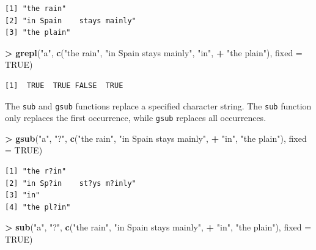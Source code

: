 \documentclass[]{krantz}
\makeatletter
\newenvironment{Shaded}{\begin{snugshade}}{\end{snugshade}}
\newcommand{\DataTypeTok}[1]{\textcolor[rgb]{0.27,0.27,0.27}{#1}}
\newcommand{\KeywordTok}[1]{\textcolor[rgb]{0.27,0.27,0.27}{\textbf{#1}}}
\newcommand{\NormalTok}[1]{#1}
\newcommand{\OperatorTok}[1]{\textcolor[rgb]{0.43,0.43,0.43}{\textbf{#1}}}
\newcommand{\OtherTok}[1]{\textcolor[rgb]{0.37,0.37,0.37}{#1}}
\newcommand{\StringTok}[1]{\textcolor[rgb]{0.5,0.5,0.5}{#1}}
\newenvironment{kframe}{%
\medskip{}
\setlength{\fboxsep}{.8em}
 \def\at@end@of@kframe{}%
 \ifinner\ifhmode%
  \def\at@end@of@kframe{\end{minipage}}%
  \begin{minipage}{\columnwidth}%
 \fi\fi%
 \def\FrameCommand##1{\hskip\@totalleftmargin \hskip-\fboxsep
 \colorbox{shadecolor}{##1}\hskip-\fboxsep
     \hskip-\linewidth \hskip-\@totalleftmargin \hskip\columnwidth}%
 \MakeFramed {\advance\hsize-\width
   \@totalleftmargin\z@ \linewidth\hsize
   \@setminipage}}%
 {\par\unskip\endMakeFramed%
 \at@end@of@kframe}
\renewenvironment{Shaded}{\begin{kframe}}{\end{kframe}}
\makeatother
\begin{document}
\begin{verbatim}
[1] "the rain"                
[2] "in Spain    stays mainly"
[3] "the plain"               
\end{verbatim}

\begin{Shaded}
\begin{Highlighting}[]
\OperatorTok{>}\StringTok{ }\KeywordTok{grepl}\NormalTok{(}\StringTok{"a"}\NormalTok{, }\KeywordTok{c}\NormalTok{(}\StringTok{"the rain"}\NormalTok{, }\StringTok{"in Spain    stays mainly"}\NormalTok{, }\StringTok{"in"}\NormalTok{, }
\OperatorTok{+}\StringTok{   "the plain"}\NormalTok{), }\DataTypeTok{fixed =} \OtherTok{TRUE}\NormalTok{)}
\end{Highlighting}
\end{Shaded}

\begin{verbatim}
[1]  TRUE  TRUE FALSE  TRUE
\end{verbatim}

The \texttt{sub} and \texttt{gsub} functions replace a specified character string. The \texttt{sub} function only replaces the first occurrence, while \texttt{gsub} replaces all occurrences.

\begin{Shaded}
\begin{Highlighting}[]
\OperatorTok{>}\StringTok{ }\KeywordTok{gsub}\NormalTok{(}\StringTok{"a"}\NormalTok{, }\StringTok{"?"}\NormalTok{, }\KeywordTok{c}\NormalTok{(}\StringTok{"the rain"}\NormalTok{, }\StringTok{"in Spain    stays mainly"}\NormalTok{, }
\OperatorTok{+}\StringTok{   "in"}\NormalTok{, }\StringTok{"the plain"}\NormalTok{), }\DataTypeTok{fixed =} \OtherTok{TRUE}\NormalTok{)}
\end{Highlighting}
\end{Shaded}

\begin{verbatim}
[1] "the r?in"                
[2] "in Sp?in    st?ys m?inly"
[3] "in"                      
[4] "the pl?in"               
\end{verbatim}

\begin{Shaded}
\begin{Highlighting}[]
\OperatorTok{>}\StringTok{ }\KeywordTok{sub}\NormalTok{(}\StringTok{"a"}\NormalTok{, }\StringTok{"?"}\NormalTok{, }\KeywordTok{c}\NormalTok{(}\StringTok{"the rain"}\NormalTok{, }\StringTok{"in Spain    stays mainly"}\NormalTok{, }
\OperatorTok{+}\StringTok{   "in"}\NormalTok{, }\StringTok{"the plain"}\NormalTok{), }\DataTypeTok{fixed =} \OtherTok{TRUE}\NormalTok{)}
\end{Highlighting}
\end{Shaded}
\end{document}
